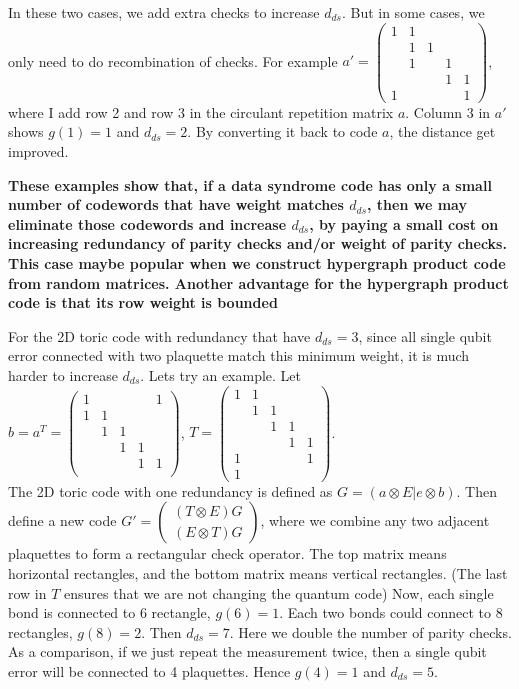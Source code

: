 \documentclass[aps,prb,12pt,tightenlines,%
notitlepage,longbibliography]{revtex4-1}
\begin{document}
In these two cases, we add extra checks to increase $d_{ds}$. But in some cases, we only need to do recombination of checks. For example
$a'=\left( \begin{array}{ccccc}1 & 1 \\  & 1 & 1 & \\ &1& &1\\ &&&1&1\\ 1 &&&&1\end{array} \right)$, where I add row 2 and row 3 in the circulant repetition matrix $a$. Column 3 in $a'$ shows $g(1)=1$ and $d_{ds}=2$. By converting it back to code $a$, the distance get improved.

\textbf{These examples show that, if a data syndrome code has only a small number of codewords that have weight matches $d_{ds}$, then we may eliminate those codewords and increase $d_{ds}$, by paying a small cost on increasing redundancy of parity checks and/or weight of parity checks. This case maybe popular when we construct hypergraph product code from random matrices. Another advantage for the hypergraph product code is that its row weight is bounded}

For the 2D toric code with redundancy that have $d_{ds}=3$, since all single qubit error connected with two plaquette match this minimum weight, it is much harder to increase $d_{ds}$. Lets try an example. Let\\
$b=a^T=\left( \begin{array}{ccccc} 1&&&&1 \\1 & 1 \\  & 1 & 1 & \\ &&1 &1\\ &&&1&1 \\\end{array} \right)$, 
$T=\left( \begin{array}{ccccc} 1 & 1 \\  & 1 & 1 & \\ &&1 &1\\ &&&1&1 \\ 1&&&&1 \\1\end{array} \right)$.\\
The 2D toric code with one redundancy is defined as 
$G=(a \otimes E |e \otimes b) $.
Then define a new code
$G'=\left( \begin{array}{c} (T \otimes E) G \\ (E \otimes T) G\end{array}\right)  $, where we combine any two adjacent plaquettes to form a rectangular check operator. The top matrix means horizontal rectangles, and the bottom matrix means vertical rectangles. (The last row in $T$ ensures that we are not changing the quantum code) Now, each single bond is connected to 6 rectangle, $g(6)=1$. Each two bonds could connect to 8 rectangles, $g(8)=2$. Then $d_{ds}=7$. Here we double the number of parity checks. 
As a comparison, if we just repeat the measurement twice, then a single qubit error will be connected to 4 plaquettes. Hence $g(4)=1$ and $d_{ds}=5$.
\end{document}
